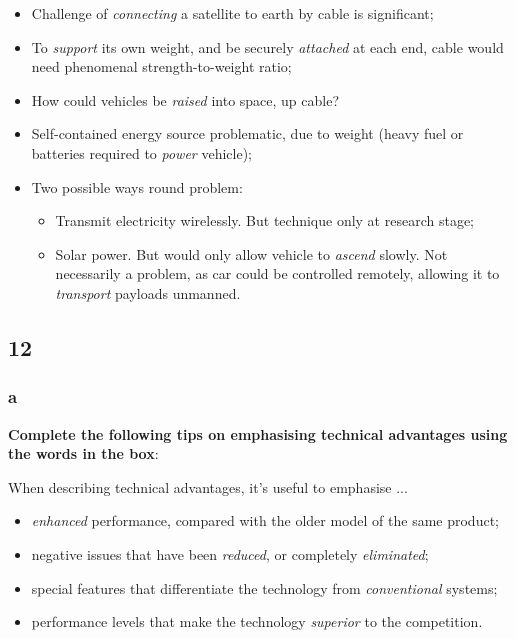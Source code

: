\begin{itemize}

\item Challenge of \textit{connecting} a satellite to earth by cable is significant;
\item To \textit{support} its own weight, and be securely \textit{attached} at each end, cable would need phenomenal strength-to-weight ratio;
\item How could vehicles be \textit{raised} into space, up cable?
\item Self-contained energy source problematic, due to weight (heavy fuel or batteries required to \textit{power} vehicle);
\item Two possible ways round problem:

\begin{itemize}

\item Transmit electricity wirelessly. But technique only at research stage;
\item Solar power. But would only allow vehicle to \textit{ascend} slowly. Not necessarily a problem, as car could be controlled remotely, allowing it to \textit{transport} payloads unmanned.

\end{itemize}
\end{itemize}

\subsection{12}

\subsubsection{a}

\textbf{Complete the following tips on emphasising technical advantages using the words in the box}:

When describing technical advantages, it's useful to emphasise ... 

\begin{itemize}

\item \textit{enhanced} performance, compared with the older model of the same product;
\item negative issues that have been \textit{reduced}, or completely \textit{eliminated};
\item special features that differentiate the technology from \textit{conventional} systems;
\item performance levels that make the technology \textit{superior} to the competition.

\end{itemize}

